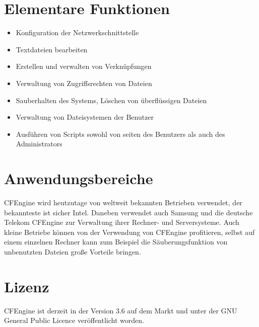 \section{Elementare Funktionen}
\begin{itemize}
	\item Konfiguration der Netzwerkschnittstelle
	\item Textdateien bearbeiten
	\item Erstellen und verwalten von Verknüpfungen
	\item Verwaltung von Zugriffsrechten von Dateien
	\item Sauberhalten des Systems, Löschen von überflüssigen Dateien
	\item Verwaltung von Dateisystemen der Benutzer
	\item Ausführen von Scripts sowohl von seiten des Benutzers als auch des Administrators
\end{itemize}
\section{Anwendungsbereiche}
CFEngine wird heutzutage von weltweit bekannten Betrieben verwendet, der bekannteste ist sicher Intel. Daneben verwendet auch Samsung und die deutsche Telekom CFEngine zur Verwaltung ihrer Rechner- und Serversysteme. Auch kleine Betriebe können von der Verwendung von CFEngine profitieren, selbst auf einem einzelnen Rechner kann zum Beispiel die Säuberungsfunktion von unbenutzten Dateien große Vorteile bringen.
\section{Lizenz}
CFEngine ist derzeit in der Version 3.6 auf dem Markt und unter der GNU General Public Licence veröffentlicht worden.
%
